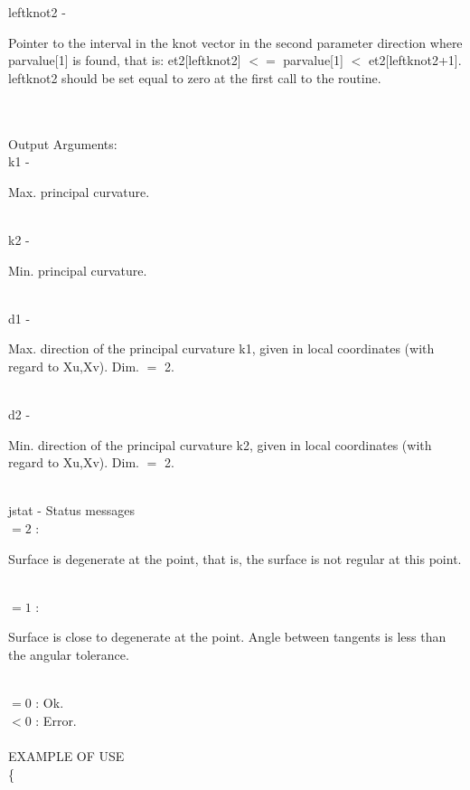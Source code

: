         \>\>    {\fov leftknot2}\> - \>  \begin{minipg2}
                     Pointer to the interval in the knot vector in the
                     second parameter direction where parvalue[1] is found,
                     that is:
                          et2[leftknot2] $<=$ parvalue[1] $<$ et2[leftknot2+1].
                     leftknot2 should be set equal to zero at the first call
                     to the routine.
                               \end{minipg2}\\[0.8ex]
\\
	\>Output Arguments:\\
        \>\>    {\fov k1}\> - \>  \begin{minipg2}
                     Max. principal curvature.
                               \end{minipg2}\\
        \>\>    {\fov k2}\> - \>  \begin{minipg2}
                     Min. principal curvature.
                               \end{minipg2}\\
        \>\>    {\fov d1}\> - \>  \begin{minipg2}
                     Max. direction of the principal curvature k1, given 
                     in local coordinates (with regard to Xu,Xv).
                     Dim. $=$ 2.
                               \end{minipg2}\\
        \>\>    {\fov d2}\> - \>  \begin{minipg2}
                     Min. direction of the principal curvature k2, given 
                     in local coordinates (with regard to Xu,Xv).
                     Dim. $=$ 2.
                               \end{minipg2}\\
        \>\>    {\fov jstat}     \> - \> Status messages\\
                \>\>\>\> $= 2$ : 
                       \> \begin{minipg5}  
                               Surface is degenerate at the point, that is,
                               the surface is not regular at this point.
                               \end{minipg5}\\[0.8ex]
                \>\>\>\>  $= 1$ :
                       \> \begin{minipg5}  
                               Surface is close to degenerate at the point.
                               Angle between tangents is less than the angular
                               tolerance.
                               \end{minipg5}\\[0.8ex]
                \>\>\>\> $= 0$ : \> Ok.\\
                \>\>\>\> $< 0$ : \> Error.\\
\\
EXAMPLE OF USE\\
		\>      \{ \\

